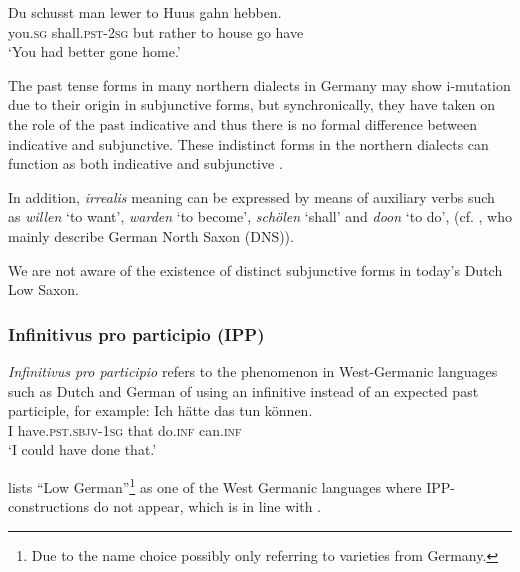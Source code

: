 \documentclass[output=paper,colorlinks,citecolor=brown]{langscibook}
\begin{document}
\ea\label{subjunctive-dns}
\gll Du  schusst  man  lewer   to   Huus    gahn    hebben.\\
     you.\textsc{sg}      shall.\textsc{pst}-\textsc{2sg}    but    rather    to    house    go    have\\
\glt `You had better gone home.' \citep[300]{Saltveit1983}
\z

The past tense forms in many northern dialects in Germany may show i-mutation due to their origin in subjunctive forms, but synchronically, they have taken on the role of the past indicative and thus there is no formal difference between indicative and subjunctive. These indistinct forms in the northern dialects can function as both indicative and subjunctive \citep[298--301]{Saltveit1983}. 



In addition, \textit{irrealis} meaning can be expressed by means of auxiliary verbs such as \textit{willen} `to want', \textit{warden} `to become', \textit{schölen} `shall' and \textit{doon} `to do', (cf. \citealt{LindowEtAl1998}, who mainly describe German North Saxon (DNS)). %


We are not aware of the existence of distinct subjunctive forms in today's Dutch Low Saxon.

\subsubsection{Infinitivus pro participio (IPP)}\label{IPP}
\textit{Infinitivus pro participio} refers to the phenomenon in West-Germanic languages such as Dutch and German of using an infinitive instead of an expected past participle, for example: 
\ea
\gll Ich hätte das tun können.\\                
     I have\textsc{.pst.sbjv-1sg} that do\textsc{.inf} can\textsc{.inf}\\
\glt`I could have done that.' 
\z

\citet[1]{Schmid2005} lists “Low German”\footnote{Due to the name choice possibly only referring to varieties from Germany.} as one of the West Germanic languages where IPP-constructions do not appear, which is in line with \citet{LindowEtAl1998}. 
\end{document}
